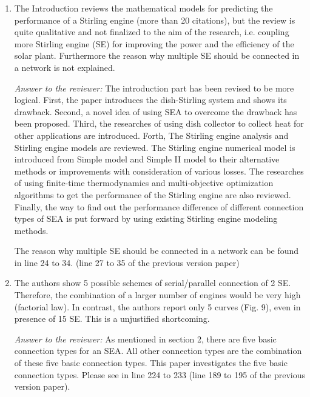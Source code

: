 \documentclass[12pt]{letter}
\begin{document}
\begin{enumerate}

\item The Introduction reviews the mathematical models for predicting the performance of a Stirling engine (more than 20 citations), but the review is quite qualitative and not finalized to the aim of the research, i.e. coupling more Stirling engine (SE) for improving the power and the efficiency of the solar plant. Furthermore the reason why multiple SE should be connected in a network is not explained.

\begin{snugshade*}
\emph{Answer to the reviewer:} 
The introduction part has been revised to be more logical. First, the paper introduces the dish-Stirling system and shows its drawback. Second, a novel idea of using SEA to overcome the drawback has been proposed. Third, the researches of using dish collector to collect heat for other applications are introduced. Forth, The Stirling engine analysis and Stirling engine models are reviewed. The Stirling engine numerical model is introduced from Simple model and Simple II model to their alternative methods or improvements with consideration of various losses.  The researches of using finite-time thermodynamics and multi-objective optimization algorithms to get the performance of the Stirling engine are also reviewed. Finally, the way to find out the performance difference of different connection types of SEA is put forward by using existing Stirling engine modeling methods.

The reason why multiple SE should be connected in a network can be found in line 24 to 34. (line 27 to 35 of the previous version paper)
\end{snugshade*}

\item The authors show 5 possible schemes of serial/parallel connection of 2 SE. Therefore, the combination of a larger number of engines would be very high (factorial law). In contrast, the authors report only 5 curves (Fig. 9), even in presence of 15 SE. This is a unjustified shortcoming.

\begin{snugshade*}
\emph{Answer to the reviewer:} 
As mentioned in section 2, there are five basic connection types for an SEA. All other connection types are the combination of these five basic connection types. This paper investigates the five basic connection types. Please see in line 224 to 233 (line 189 to 195 of the previous version paper). 
\end{snugshade*}


\end{enumerate}
\end{document}
